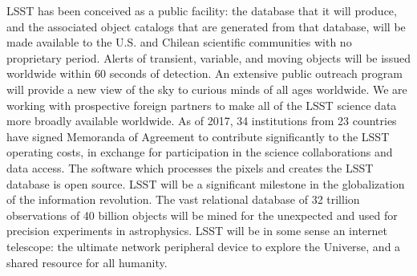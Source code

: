 

LSST has been conceived as a public facility: the database that it will
produce, and the associated object catalogs that are generated from that
database, will be made available to the U.S. and Chilean
scientific communities with no proprietary period.
Alerts of transient, variable, and moving objects will be issued worldwide within
60 seconds of detection.
An extensive public outreach program will provide a new view of the sky to
curious minds of all ages worldwide.
We are working with prospective foreign partners to make all of the LSST science data more broadly available worldwide.  As of 2017, 34 institutions from 23 countries
have signed Memoranda of Agreement to contribute significantly to
the LSST operating costs, in exchange for participation in the science collaborations
and data access.  The software which processes the pixels
and creates the LSST database is open source.
LSST will be a significant milestone in the globalization of the information revolution.
The vast relational database of 32 trillion observations of 40 billion objects
will be mined for the unexpected and used for precision experiments in astrophysics.
LSST will be in some sense an internet telescope:
the ultimate network peripheral device to explore the Universe, and
a shared resource for all humanity.
